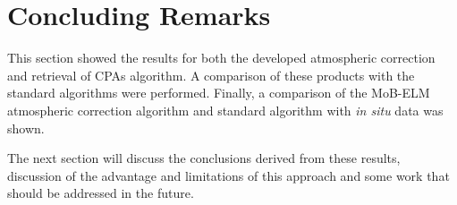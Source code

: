 \section{Concluding Remarks}

This section showed the results for both the developed atmospheric correction and retrieval of CPAs algorithm. A comparison of these products with the standard algorithms were performed. Finally, a comparison of the MoB-ELM atmospheric correction algorithm and standard algorithm with {\it in situ} data was shown. 

The next section will discuss the conclusions derived from these results, discussion of the advantage and limitations of this approach and some work that should be addressed in the future.